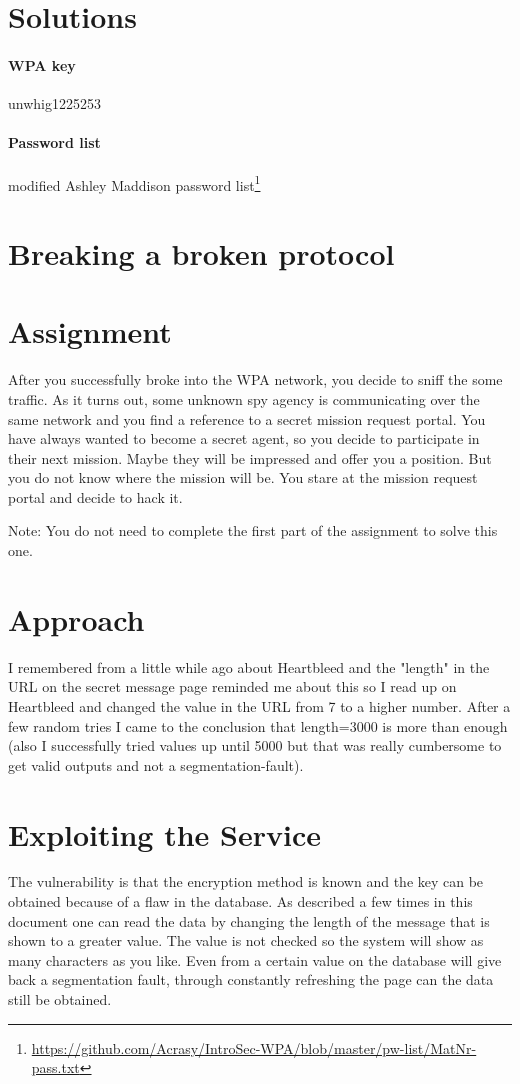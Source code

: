 \documentclass{scrartcl}
\newcommand\solution[2]{{\paragraph{#1}#2}}
\begin{document}
\section*{Solutions}
\solution{WPA key}{unwhig1225253}
\solution{Password list}{modified Ashley Maddison password list\footnote{\url{https://github.com/Acrasy/IntroSec-WPA/blob/master/pw-list/MatNr-pass.txt}}}


\newpage

\section{Breaking a broken protocol}

\section*{Assignment}
After you successfully broke into the WPA network, you decide to sniff the some traffic.
As it turns out, some unknown spy agency is communicating over the same network and you find a 
reference to a secret mission request portal. You have always wanted to become a secret
agent, so you decide to participate in their next mission. Maybe they will be impressed and offer you a position.
But you do not know where the mission will be. You stare at the mission request portal and decide to hack it.

Note: You do not need to complete the first part of the assignment to solve this one.

\section*{Approach}
I remembered from a little while ago about Heartbleed and the "length" in the URL on the secret message page reminded me about this so I read up on Heartbleed and changed the value in the URL 
from 7 to a higher number. After a few random tries I came to the conclusion that length=3000 is more than enough (also I successfully tried values up until 5000 but that was really cumbersome to get valid outputs and not a segmentation-fault). \\


\section*{Exploiting the Service}
The vulnerability is that the encryption method is known and the key can be obtained because of a flaw in the database. As described a few times in this document one can read the data by changing the length of the message that is shown to a greater value. The value is not checked so the system will show as many characters as you like. Even from a certain value on the database will give back a segmentation fault, through constantly refreshing the page can the data still be obtained.\\
\end{document}
